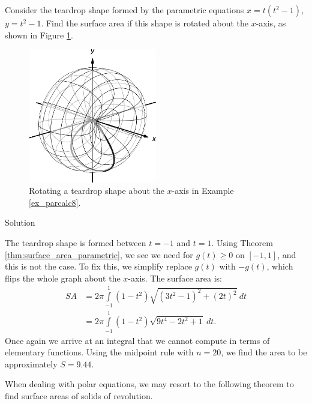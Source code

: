 \begin{example}\label{ex_parcalc8}
Consider the teardrop shape formed by the parametric equations $x=t(t^2-1)$, $y=t^2-1$. Find the surface area if this shape is rotated about the $x$-axis, as shown in Figure \ref{fig_int_app_29}.

	\begin{figure}[H]
	\begin{center}
			\includegraphics[width=0.5\textwidth]{fig_int_app_29}
	\caption{Rotating a teardrop shape about the $x$-axis in Example \ref{ex_parcalc8}.}
	\label{fig_int_app_29}
	\end{center}
\end{figure}

Solution 

The teardrop shape is formed between $t=-1$ and $t=1$. Using Theorem \ref{thm:surface_area_parametric}, we see we need for $g(t)\geq 0$ on $[-1,1]$, and this is not the case. To fix this, we simplify replace $g(t)$ with $-g(t)$, which flips the whole graph about the $x$-axis. The surface area is: 
\begin{align*}
SA &= 2\pi\int\limits_{-1}^1 (1-t^2)\sqrt{(3t^2-1)^2+(2t)^2}\ dt\\[0.2cm]
		&=	2\pi\int\limits_{-1}^1 (1-t^2)\sqrt{9t^4-2t^2+1} \ dt.
		\end{align*}
Once again we arrive at an integral that we cannot compute in terms of elementary functions. Using the midpoint rule with $n=20$, we find the area to be approximately $S=9.44$. 
\end{example}

When dealing with polar equations, we may resort to the following theorem to find surface areas of solids of revolution. 

